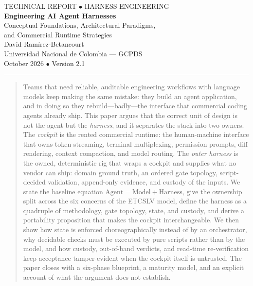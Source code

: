 \documentclass[10pt,a4paper]{article}
\theoremstyle{definition}
\theoremstyle{plain}
\theoremstyle{principle}
\begin{document}
\thispagestyle{empty}
\begin{center}
  {\color{muted}\small TECHNICAL REPORT \;$\bullet$\; HARNESS ENGINEERING}\\[14pt]
  {\LARGE\bfseries Engineering AI Agent Harnesses}\\[8pt]
  {\large Conceptual Foundations, Architectural Paradigms,\\[2pt]
   and Commercial Runtime Strategies}\\[18pt]
  {\normalsize David Ram\'irez-Betancourt}\\[2pt]
  {\small Universidad Nacional de Colombia --- GCPDS}\\[2pt]
  {\small October 2026 \;$\bullet$\; Version 2.1}
\end{center}

\vspace{2pt}
{\color{line}\hrule height 0.6pt}
\vspace{10pt}

\begin{abstract}
\noindent
Teams that need reliable, auditable engineering workflows with language models keep making the
same mistake: they build an agent application, and in doing so they rebuild---badly---the
interface that commercial coding agents already ship. This paper argues that the correct unit of
design is not the agent but the \emph{harness}, and it separates the stack into two owners. The
\emph{cockpit} is the rented commercial runtime: the human-machine interface that owns token
streaming, terminal multiplexing, permission prompts, diff rendering, context compaction, and
model routing. The \emph{outer harness} is the owned, deterministic rig that wraps a cockpit and
supplies what no vendor can ship: domain ground truth, an ordered gate topology, script-decided
validation, append-only evidence, and custody of the inputs. We state the baseline equation
$\text{Agent}=\text{Model}+\text{Harness}$, give the ownership split across the six concerns of
the ETCSLV model, define the harness as a quadruple of methodology, gate topology, state, and
custody, and derive a portability proposition that makes the cockpit interchangeable. We then
show how state is enforced choreographically instead of by an orchestrator, why decidable checks
must be executed by pure scripts rather than by the model, and how custody, out-of-band verdicts, and read-time re-verification keep acceptance
tamper-evident when the cockpit itself is untrusted. The paper closes with a six-phase blueprint, a maturity model, and an explicit
account of what the argument does not establish.
\end{abstract}
\end{document}
